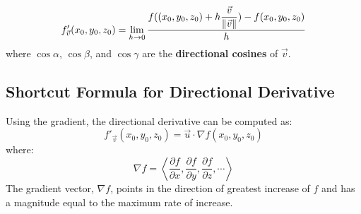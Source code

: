 \begin{equation}\label{Directional Derivative at a Point Definition}
    f'_{\vec{v}}(x_0, y_0, z_0) = 
    \lim_{h \to 0}
    \dfrac{
        f((x_0, y_0, z_0) + h\dfrac{\vec{v}}{\left\Vert\vec{v}\right\Vert}) - f(x_0, y_0, z_0)
    }{h}
\end{equation}
where \(\cos \alpha\), \(\cos \beta\), and \(\cos \gamma\) are the \textbf{directional cosines} of \(\vec{v}\).

\subsection{Shortcut Formula for Directional Derivative}
Using the gradient, the directional derivative can be computed as:
\begin{equation}\label{Directional Derivative Shortcut}
    f'_{\vec{v}}(x_0, y_0, z_0) = \vec{u} \cdot \nabla f(x_0, y_0, z_0)
\end{equation}
where:
\begin{equation}\label{Gradient Definition}
    \nabla f = \left\langle \dfrac{\partial f}{\partial x}, \dfrac{\partial f}{\partial y}, \dfrac{\partial f}{\partial z}, \cdots \right\rangle
\end{equation}
The gradient vector, \(\nabla f\), points in the direction of greatest increase of \(f\) and has a magnitude equal to the maximum rate of increase.